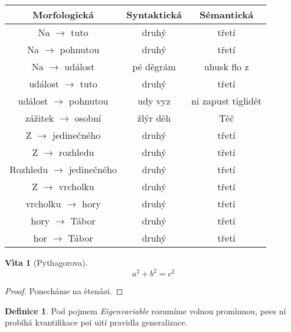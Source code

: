 \documentclass[12pt,a4paper]{article}
\newtheorem{veta}{Vìta}%
\theoremstyle{definition}
\newtheorem*{definice}{Definice}
\begin{document}
\begin{tabular}{|c||c||c|}
\hline
Morfologick\'{a} & Syntaktick\'{a} & S\'{e}mantick\'{a}\\
\hline
\hline
Na  $ \rightarrow $ tuto & druhý & třetí \\
\hline
Na  $ \rightarrow $ pohnutou & druhý & třetí \\
\hline
Na  $ \rightarrow $ ud\'{a}lost & pé děgrám & uhusk flo z  \\
\hline
ud\'{a}lost  $ \rightarrow $ tuto & druhý & třetí \\
\hline 
ud\'{a}lost  $ \rightarrow $ pohnutou & udy vyz & ni zapust tiglidět \\
\hline
z\'{a}\v{z}itek $ \rightarrow $ osobn\'{i} & žlýr děh & Těč \\
\hline
Z  $ \rightarrow $ jedine\v{c}n\'{e}ho & druhý & třetí \\
\hline
Z  $ \rightarrow $ rozhledu & druhý & třetí \\
\hline
Rozhledu  $ \rightarrow $ jedine\v{c}n\'{e}ho & druhý & třetí \\
\hline
Z  $ \rightarrow $ vrcholku & druhý & třetí \\
\hline
vrcholku  $ \rightarrow $ hory & druhý & třetí \\
\hline
hory  $ \rightarrow $ T\'{a}bor & druhý & třetí \\
\hline
hor  $ \rightarrow $ T\'{a}bor & druhý & třetí \\
\end{tabular}


\begin{veta}[Pythagorova]\label{veta:Pythagorova}%
\[  a^2 + b^2 = c^2\]
\end{veta}

\begin{proof} %
Ponecháme na ètenáøi.
\end{proof}

\begin{definice}%
Pod pojmem \emph{Eigenvariable} rozumíme volnou promìnnou, pøes ní probíhá kvantifikace pøi uití pravidla generalizace.
\end{definice}
\end{document}

